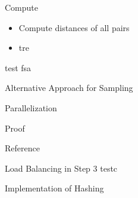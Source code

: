 \documentclass[18pt]{beamer}
\def \loose {15pt}
\begin{document}
\begin{frame}{Compute}
	\begin{itemize}
		\setlength{\itemsep}{\loose}
		\item Compute distances of all pairs
		\item tre
	\end{itemize}
	\begin{theorem}{test}
		fsa
	\end{theorem}
\end{frame}

\begin{frame}{Alternative Approach for Sampling}

\end{frame}



\begin{frame}{Parallelization}

\end{frame}

\begin{frame}{Proof}

\end{frame}
%

\appendix
\beginbackup


\nocite{major}
\nocite{dietzfelbinger1997reliable}
\nocite{fortune1978note}
\nocite{chap13}
\nocite{web}
\nocite{khuller1995simple}
\nocite{Bentley:1976:DMS:800113.803652}

\begin{frame}[allowframebreaks]{Reference}
\printbibliography
\end{frame}


\begin{frame}{Load Balancing in Step 3}
testc
\end{frame}

\begin{frame}{Implementation of Hashing}

\end{frame}


\backupend
\end{document}
